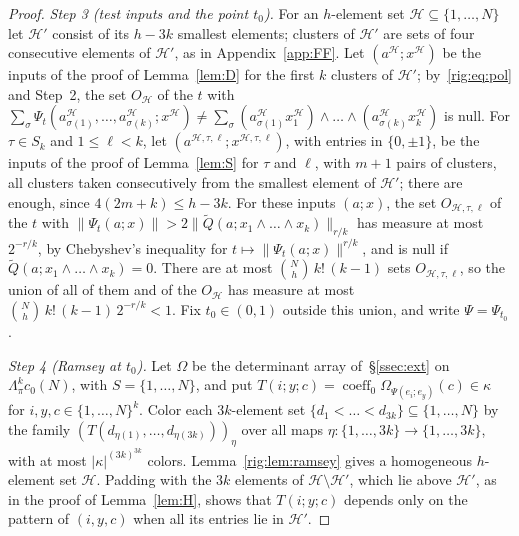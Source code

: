 \documentclass[11pt]{amsart}
\theoremstyle{definition}
\theoremstyle{remark}
\numberwithin{equation}{section}
\newcommand{\abs}[1]{\lvert #1\rvert}
\newcommand{\norm}[1]{\lVert #1\rVert}
\newcommand{\coeff}{\operatorname{coeff}}
\theoremstyle{plain}
\theoremstyle{definition}
\theoremstyle{plain}
\begin{document}
\begin{proof}
\emph{Step 3 (test inputs and the point $t_0$).} For an $h$\nobreakdash-element set $\mathcal H\subseteq\{1,\dots,N\}$
let $\mathcal H'$ consist of its $h-3k$ smallest elements; clusters of $\mathcal H'$ are sets of four consecutive
elements of $\mathcal H'$, as in Appendix~\ref{app:FF}. Let $(a^{\mathcal H};x^{\mathcal H})$ be the inputs of the proof
of Lemma~\ref{lem:D} for the first $k$ clusters of $\mathcal H'$; by~\eqref{rig:eq:pol} and Step~2, the set
$O_{\mathcal H}$ of the $t$ with
$\sum_\sigma\Psi_t(a^{\mathcal H}_{\sigma(1)},\dots,a^{\mathcal H}_{\sigma(k)};x^{\mathcal H})
\ne\sum_\sigma(a^{\mathcal H}_{\sigma(1)}x^{\mathcal H}_1)\wedge\dots\wedge(a^{\mathcal H}_{\sigma(k)}x^{\mathcal H}_k)$ is
null. For $\tau\in S_k$ and $1\le\ell<k$, let $(a^{\mathcal H,\tau,\ell};x^{\mathcal H,\tau,\ell})$, with entries in
$\{0,\pm1\}$, be the inputs of the proof of Lemma~\ref{lem:S} for $\tau$ and $\ell$, with $m+1$ pairs of clusters, all
clusters taken consecutively from the smallest element of $\mathcal H'$; there are enough, since $4(2m+k)\le h-3k$. For
these inputs $(a;x)$, the set $O_{\mathcal H,\tau,\ell}$ of the $t$ with
$\norm{\Psi_t(a;x)}>2\norm{\widetilde Q(a;x_1\wedge\dots\wedge x_k)}_{r/k}$ has measure at most $2^{-r/k}$, by
Chebyshev's inequality for $t\mapsto\norm{\Psi_t(a;x)}^{r/k}$, and is null if
$\widetilde Q(a;x_1\wedge\dots\wedge x_k)=0$. There are at most $\binom Nh\,k!\,(k-1)$ sets $O_{\mathcal H,\tau,\ell}$, so
the union of all of them and of the $O_{\mathcal H}$ has measure at most $\binom Nh\,k!\,(k-1)\,2^{-r/k}<1$. Fix
$t_0\in(0,1)$ outside this union, and write $\Psi=\Psi_{t_0}$.

\emph{Step 4 (Ramsey at $t_0$).} Let $\Omega$ be the determinant array of~\S\ref{ssec:ext} on $\Lambda^k_\pi c_0(N)$,
with $S=\{1,\dots,N\}$, and put $T(i;y;c)=\coeff_0\Omega_{\Psi(e_i;e_y)}(c)\in\kappa$ for $i,y,c\in\{1,\dots,N\}^k$.
Color each $3k$\nobreakdash-element set $\{d_1<\dots<d_{3k}\}\subseteq\{1,\dots,N\}$ by the family
$(T(d_{\eta(1)},\dots,d_{\eta(3k)}))_\eta$ over all maps $\eta\colon\{1,\dots,3k\}\to\{1,\dots,3k\}$, with at most
$\abs\kappa^{(3k)^{3k}}$ colors. Lemma~\ref{rig:lem:ramsey} gives a homogeneous $h$\nobreakdash-element set
$\mathcal H$. Padding with the $3k$ elements of $\mathcal H\setminus\mathcal H'$, which lie above $\mathcal H'$, as in
the proof of Lemma~\ref{lem:H}, shows that $T(i;y;c)$ depends only on the pattern of $(i,y,c)$ when all its entries lie
in $\mathcal H'$.


\end{proof}
\end{document}
